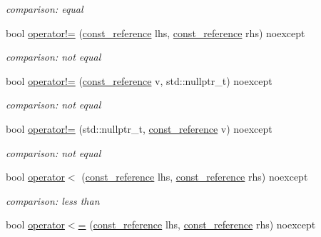 \begin{DoxyCompactItemize}
\begin{DoxyCompactList}\small\item\em comparison\-: equal \end{DoxyCompactList}\item 
bool \hyperlink{classnlohmann_1_1basic__json_a6e2e21da48f5d9471716cd868a068327}{operator!=} (\hyperlink{classnlohmann_1_1basic__json_af677a29b0e66edc9f66e5167e4667071}{const\-\_\-reference} lhs, \hyperlink{classnlohmann_1_1basic__json_af677a29b0e66edc9f66e5167e4667071}{const\-\_\-reference} rhs) noexcept
\begin{DoxyCompactList}\small\item\em comparison\-: not equal \end{DoxyCompactList}\item 
bool \hyperlink{classnlohmann_1_1basic__json_ae347859ec88176ef76a0cbe5b4514fcf}{operator!=} (\hyperlink{classnlohmann_1_1basic__json_af677a29b0e66edc9f66e5167e4667071}{const\-\_\-reference} v, std\-::nullptr\-\_\-t) noexcept
\begin{DoxyCompactList}\small\item\em comparison\-: not equal \end{DoxyCompactList}\item 
bool \hyperlink{classnlohmann_1_1basic__json_a7f97a91ad8f1d5cf0b9213bd24f247c4}{operator!=} (std\-::nullptr\-\_\-t, \hyperlink{classnlohmann_1_1basic__json_af677a29b0e66edc9f66e5167e4667071}{const\-\_\-reference} v) noexcept
\begin{DoxyCompactList}\small\item\em comparison\-: not equal \end{DoxyCompactList}\item 
bool \hyperlink{classnlohmann_1_1basic__json_aacd442b66140c764c594ac8ad7dfd5b3}{operator$<$} (\hyperlink{classnlohmann_1_1basic__json_af677a29b0e66edc9f66e5167e4667071}{const\-\_\-reference} lhs, \hyperlink{classnlohmann_1_1basic__json_af677a29b0e66edc9f66e5167e4667071}{const\-\_\-reference} rhs) noexcept
\begin{DoxyCompactList}\small\item\em comparison\-: less than \end{DoxyCompactList}\item 
bool \hyperlink{classnlohmann_1_1basic__json_a5c8bb5200f5eac10d31e26be46e5b1ac}{operator$<$=} (\hyperlink{classnlohmann_1_1basic__json_af677a29b0e66edc9f66e5167e4667071}{const\-\_\-reference} lhs, \hyperlink{classnlohmann_1_1basic__json_af677a29b0e66edc9f66e5167e4667071}{const\-\_\-reference} rhs) noexcept

\end{DoxyCompactItemize}
